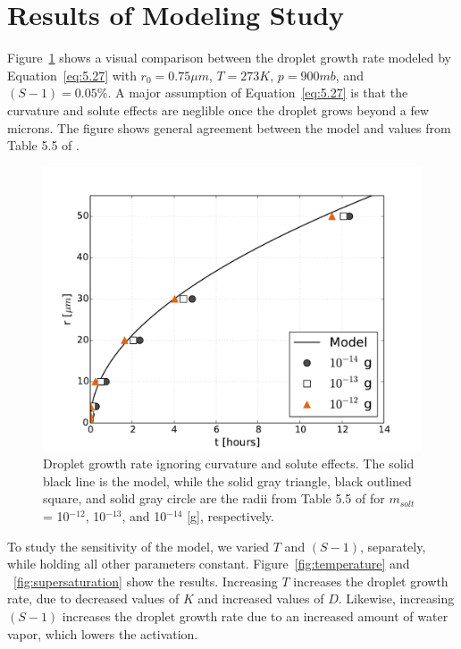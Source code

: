 \documentclass[]{article}
\begin{document}
\section{Results of Modeling Study}
Figure~\ref{fig:r_t} shows a visual comparison between the droplet growth rate
modeled by Equation~\eqref{eq:5.27} with $r_0 = 0.75 \mu m$, $T=273 K$, $p=900
mb$, and $(S - 1) = 0.05\%$. A major assumption of Equation~\eqref{eq:5.27} is
that the curvature and solute effects are neglible once the droplet grows
beyond a few microns. The figure shows general agreement between the model and
values from Table 5.5 of \cite{Curry}.

\begin{figure}[h]
    \centering
    \includegraphics[width=\textwidth]{r_t.pdf}
    \caption{Droplet growth rate ignoring curvature and solute effects. The solid black line is the model, while the solid gray triangle, black outlined square, and solid gray circle are the radii from Table 5.5 of \cite{Curry} for $m_{solt}$ = 10$^{-12}$, 10$^{-13}$, and 10$^{-14}$ [g], respectively.}
    \label{fig:r_t}
\end{figure}


To study the sensitivity of the model, we varied $T$ and $(S - 1)$, separately,
while holding all other parameters constant. Figure~\ref{fig:temperature} and
~\ref{fig:supersaturation} show the results.  Increasing $T$ increases the
droplet growth rate, due to decreased values of $K$ and increased values of
$D$.  Likewise, increasing $(S - 1)$ increases the droplet growth rate due to
an increased amount of water vapor, which lowers the activation.
\end{document}
